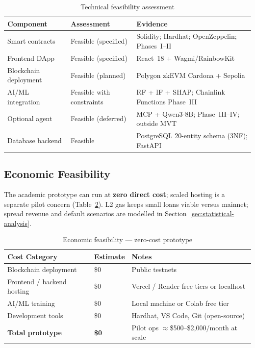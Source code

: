 \documentclass[12pt, a4paper]{report}
\newcommand{\tableheadcolor}{\rowcolor{TableHeadBg}}
\begin{document}
\begin{table}[H]
\centering
\caption[Technical feasibility assessment]{Technical feasibility assessment}
\label{tab:tech-feasibility}
\begin{tabular}{p{3cm}p{3cm}p{7.5cm}}
\toprule
\tableheadcolor
\textbf{Component} & \textbf{Assessment} & \textbf{Evidence} \\
\midrule
Smart contracts & Feasible (specified) & Solidity; Hardhat; OpenZeppelin; Phases~I--II \\
Frontend DApp & Feasible (specified) & React~18 + Wagmi/RainbowKit \\
Blockchain deployment & Feasible (planned) & Polygon zkEVM Cardona + Sepolia \\
AI/ML integration & Feasible with constraints & RF + IF + SHAP; Chainlink Functions Phase~III \\
Optional agent & Feasible (deferred) & MCP + Qwen3-8B; Phase~III--IV; outside MVT \\
Database backend & Feasible & PostgreSQL 20-entity schema (3NF); FastAPI \\
\bottomrule
\end{tabular}
\end{table}

\vspace{2pt}

\subsection{Economic Feasibility}

The academic prototype can run at \textbf{zero direct cost}; scaled hosting is a separate pilot concern (Table~\ref{tab:economic-feasibility}). L2 gas keeps small loans viable versus mainnet; spread revenue and default scenarios are modelled in Section~\ref{sec:statistical-analysis}.

\begin{table}[H]
\centering
\caption[Economic feasibility --- zero-cost prototype]{Economic feasibility --- zero-cost prototype}
\label{tab:economic-feasibility}
\begin{tabular}{p{4cm}p{2.5cm}p{7cm}}
\toprule
\tableheadcolor
\textbf{Cost Category} & \textbf{Estimate} & \textbf{Notes} \\
\midrule
Blockchain deployment & \$0 & Public testnets \\
Frontend / backend hosting & \$0 & Vercel / Render free tiers or localhost \\
AI/ML training & \$0 & Local machine or Colab free tier \\
Development tools & \$0 & Hardhat, VS Code, Git (open-source) \\
\textbf{Total prototype} & \textbf{\$0} & Pilot ops $\approx$\$500--\$2{,}000/month at scale \\
\bottomrule
\end{tabular}
\end{table}
\end{document}
